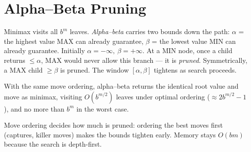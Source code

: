 \section{Alpha--Beta Pruning}
\label{sec:alphabeta}

Minimax visits all $b^{m}$ leaves. \emph{Alpha--beta} carries two bounds down the path: $\alpha$ = the highest value MAX can already guarantee, $\beta$ = the lowest value MIN can already guarantee. Initially $\alpha=-\infty,\ \beta=+\infty$. At a MIN node, once a child returns $\le\alpha$, MAX would never allow this branch --- it is \emph{pruned}. Symmetrically, a MAX child $\ge\beta$ is pruned. The window $[\alpha,\beta]$ tightens as search proceeds.

\begin{theorem}
\label{thm:ab}
With the same move ordering, alpha--beta returns the identical root value and move as minimax, visiting $O(b^{m/2})$ leaves under optimal ordering ($\approx 2b^{m/2}-1$), and no more than $b^{m}$ in the worst case.
\end{theorem}

Move ordering decides how much is pruned: ordering the best moves first (captures, killer moves) makes the bounds tighten early. Memory stays $O(bm)$ because the search is depth-first.

